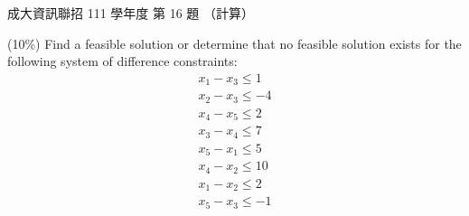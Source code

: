 \begin{pastexam}[label={px:ncku-111-prog-16}]{成大資訊聯招 111 學年度 第 16 題}
（計算）

(10\%) Find a feasible solution or determine that no feasible solution exists for the following system of difference constraints:
\[
\begin{array}{l}
x_1-x_3\le 1\\
x_2-x_3\le -4\\
x_4-x_5\le 2\\
x_3-x_4\le 7\\
x_5-x_1\le 5\\
x_4-x_2\le 10\\
x_1-x_2\le 2\\
x_5-x_3\le -1
\end{array}
\]
\end{pastexam}

